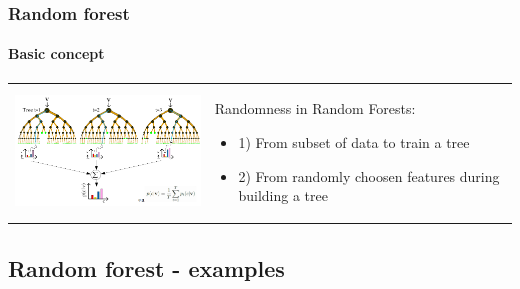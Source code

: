 \begin{frame}
	\frametitle{Random forest}
		\framesubtitle{Basic concept}

		\begin{center}
		\begin{tabular}{m{7cm} m{3cm}}
		\includegraphics[width=7cm]{./figures/basic_concept}
		&
		Randomness in Random Forests:
		\begin{itemize}
		  \item 1) From subset of data to train a tree
		  \item 2) From randomly choosen features during building a  tree
		\end{itemize}
		\\
		\end{tabular}
		\end{center}
		
\end{frame}

\subsection{Random forest - examples} %

